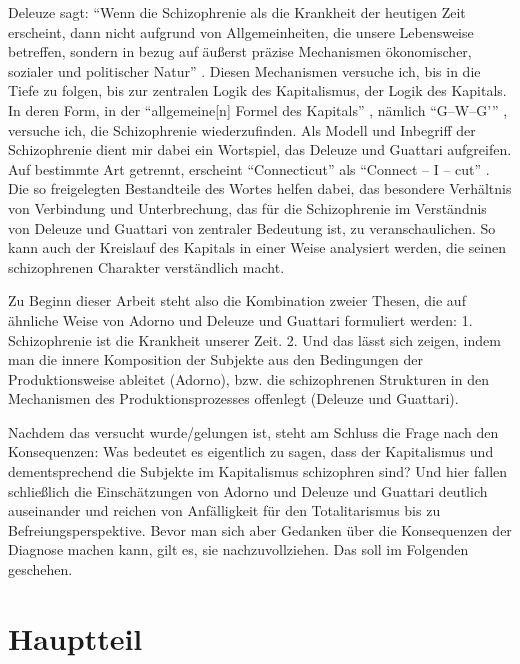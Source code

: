 \documentclass[12pt,
               DIV13,
               paper=a4,
               twoside=false,
               onehalfspacing,
               bibliography=totoc,
               toc=graduated,
               draft,
               ]{scrartcl}
\newcommand{\pc}[2]{\parencite[#1]{#2}}
\newcommand{\dg}{Deleuze und Guattari\xspace}
\begin{document}
Deleuze sagt: "`Wenn die Schizophrenie als die Krankheit der heutigen
Zeit erscheint, dann nicht aufgrund von Allgemeinheiten, die unsere
Lebensweise betreffen, sondern in bezug auf äußerst präzise
Mechanismen ökonomischer, sozialer und politischer Natur"'
\pc{28}{schizg}. Diesen Mechanismen versuche ich, bis in die Tiefe zu
folgen, bis zur zentralen Logik des Kapitalismus, der Logik des
Kapitals. In deren Form, in der "`allgemeine[n] Formel des Kapitals"'
\pc{161}{kap}, nämlich "`G--W--G'"' \pc{165}{kap}, versuche ich, die
Schizophrenie wiederzufinden. Als Modell und Inbegriff der Schizophrenie
dient mir dabei ein Wortspiel, das \dg aufgreifen. Auf bestimmte Art
getrennt, erscheint "`Connecticut"' als "`Connect -- I -- cut"'
\pc{48}{ao}. Die so freigelegten Bestandteile des Wortes helfen dabei,
das besondere Verhältnis von Verbindung und Unterbrechung, das für die
Schizophrenie im Verständnis von \dg von zentraler Bedeutung ist, zu
veranschaulichen. So kann auch der Kreislauf des Kapitals in einer
Weise analysiert werden, die seinen schizophrenen Charakter
verständlich macht.

Zu Beginn dieser Arbeit steht also die Kombination zweier Thesen, die
auf ähnliche Weise von Adorno und \dg formuliert werden: 1.
Schizophrenie ist die Krankheit unserer Zeit. 2. Und das lässt sich
zeigen, indem man die innere Komposition der Subjekte aus den
Bedingungen der Produktionsweise ableitet (Adorno), bzw. die
schizophrenen Strukturen in den Mechanismen des Produktionsprozesses
offenlegt (\dg).

Nachdem das versucht wurde/gelungen ist, steht am Schluss die Frage
nach den Konsequenzen: Was bedeutet es eigentlich zu sagen, dass der
Kapitalismus und dementsprechend die Subjekte im Kapitalismus
schizophren sind? Und hier fallen schließlich die Einschätzungen von
Adorno und \dg deutlich auseinander und reichen von \glq Anfälligkeit
für den Totalitarismus\grq{} bis zu \glq Befreiungsperspektive\grq{}.
Bevor man  sich aber Gedanken über die Konsequenzen der Diagnose
machen kann, gilt es, sie nachzuvollziehen. Das soll im Folgenden
geschehen.



\section{Hauptteil}
\end{document}
